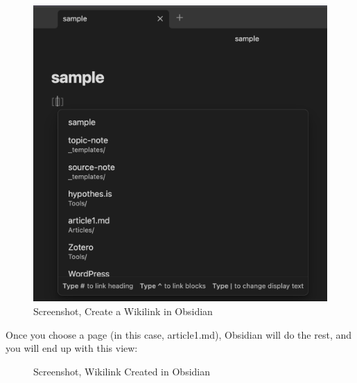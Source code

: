 \documentclass[
  letterpaper,
  DIV=11,
  numbers=noendperiod]{scrreprt}
\begin{document}
\begin{figure}

\caption{\label{fig-wikilink}Screenshot, Create a Wikilink in Obsidian}

\includegraphics{assets/u3/wikilink.png}

\end{figure}%

Once you choose a page (in this case, article1.md), Obsidian will do the
rest, and you will end up with this view:

\begin{figure}

\caption{\label{fig-wikilink2}Screenshot, Wikilink Created in Obsidian}


\end{figure}%
\end{document}
